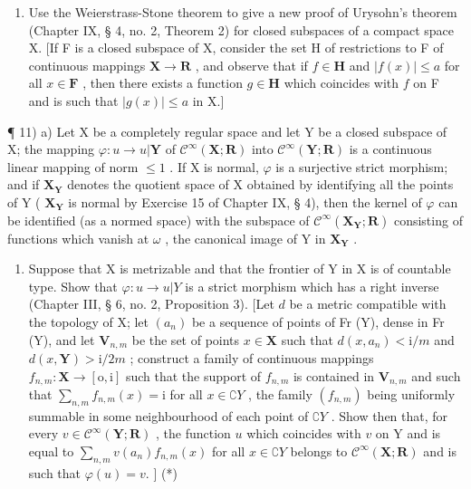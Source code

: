 \begin{enumerate}
\def\labelenumi{\arabic{enumi})}
\setcounter{enumi}{9}
\tightlist
\item
  Use the Weierstrass-Stone theorem to give a new proof of Urysohn's theorem (Chapter IX, § 4, no. 2, Theorem 2) for closed subspaces of a compact space X. {[}If F is a closed subspace of X, consider the set H of restrictions to F of continuous mappings \(\mathbf{X} \to \mathbf{R}\) , and observe that if \(f \in \mathbf{H}\) and \(|f(x)| \leqslant a\) for all \(x \in \mathbf{F}\) , then there exists a function \(g \in \mathbf{H}\) which coincides with \(f\) on F and is such that \(|g(x)| \leqslant a\) in X.{]}
\end{enumerate}

¶ 11) a) Let X be a completely regular space and let Y be a closed subspace of X; the mapping \(\varphi: u \to u|\mathbf{Y}\) of \(\mathcal{C}^{\infty}(\mathbf{X}; \mathbf{R})\) into \(\mathcal{C}^{\infty}(\mathbf{Y}; \mathbf{R})\) is a continuous linear mapping of norm \(\leqslant 1\) . If X is normal, \(\varphi\) is a surjective strict morphism; and if \(\mathbf{X}_{\mathbf{Y}}\) denotes the quotient space of X obtained by identifying all the points of Y ( \(\mathbf{X}_{\mathbf{Y}}\) is normal by Exercise 15 of Chapter IX, § 4), then the kernel of \(\varphi\) can be identified (as a normed space) with the subspace of \(\mathcal{C}^{\infty}(\mathbf{X}_{\mathbf{Y}}; \mathbf{R})\) consisting of functions which vanish at \(\omega\) , the canonical image of Y in \(\mathbf{X}_{\mathbf{Y}}\) .

\begin{enumerate}
\def\labelenumi{\alph{enumi})}
\setcounter{enumi}{1}
\tightlist
\item
  Suppose that X is metrizable and that the frontier of Y in X is of countable type. Show that \(\varphi: u \to u|Y\) is a strict morphism which has a right inverse (Chapter III, § 6, no. 2, Proposition 3). {[}Let \(d\) be a metric compatible with the topology of X; let \((a_n)\) be a sequence of points of Fr (Y), dense in Fr (Y), and let \(\mathbf{V}_{n,m}\) be the set of points \(x \in \mathbf{X}\) such that \(d(x, a_n) < \mathrm{i}/m\) and \(d(x, \mathbf{Y}) > \mathrm{i}/2m\) ; construct a family of continuous mappings \(f_{n,m}: \mathbf{X} \to [\mathrm{o}, \mathrm{i}]\) such that the support of \(f_{n,m}\) is contained in \(\mathbf{V}_{n,m}\) and such that \(\sum_{n,m} f_{n,m}(x) = \mathrm{i}\) for all \(x \in \complement Y\) , the family \((f_{n,m})\) being uniformly summable in some neighbourhood of each point of \(\complement Y\) . Show then that, for every \(v \in \mathcal{C}^\infty(\mathbf{Y}; \mathbf{R})\) , the function \(u\) which coincides with \(v\) on Y and is equal to \(\sum_{n,m} v(a_n) f_{n,m}(x)\) for all \(x \in \complement Y\) belongs to \(\mathcal{C}^\infty(\mathbf{X}; \mathbf{R})\) and is such that \(\varphi(u) = v.\) {]} (*)
\end{enumerate}

